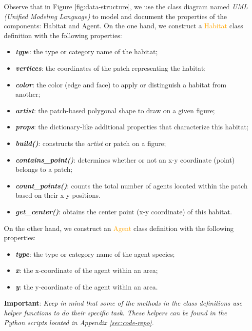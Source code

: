 \noindent
Observe that in Figure \ref{fig:data-structure}, we use the class diagram named \emph{UML (Unified Modeling Language)} to model and document the properties of the components: Habitat and Agent. On the one hand, we construct a \textcolor{orange}{Habitat} class definition with the following properties:
\begin{itemize}
    \item \textbf{\textit{type}}: the type or category name of the habitat;
    \item \textbf{\textit{vertices}}: the coordinates of the patch representing the habitat;
    \item \textbf{\textit{color}}: the color (edge and face) to apply or distinguish a habitat from another;
    \item \textbf{\textit{artist}}: the patch-based polygonal shape to draw on a given figure;
    \item \textbf{\textit{props}}: the dictionary-like additional properties that characterize this habitat;
    \item \textbf{\textit{build()}}: constructs the \emph{artist} or patch on a figure;
    \item \textbf{\textit{contains\_point()}}: determines whether or not an x-y coordinate (point) belongs to a patch;
    \item \textbf{\textit{count\_points()}}: counts the total number of agents located within the patch based on their x-y positions.
    \item \textbf{\textit{get\_center()}}: obtains the center point (x-y coordinate)  of this habitat.
\end{itemize}

\noindent
On the other hand, we construct an \textcolor{orange}{Agent} class definition with the following properties:
\begin{itemize}
    \item \textbf{\textit{type}}: the type or category name of the agent species;
    \item \textbf{\textit{x}}: the x-coordinate of the agent within an area;
    \item \textbf{\textit{y}}: the y-coordinate of the agent within an area.
\end{itemize}

\noindent
\textbf{Important}: \textit{Keep in mind that some of the methods in the class definitions use helper functions to do their specific task. These helpers can be found in the Python scripts located in Appendix \ref{sec:code-repo}.}

